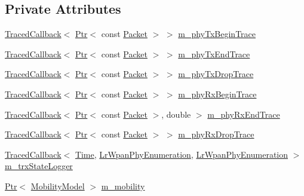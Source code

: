 \subsection*{Private Attributes}
\begin{DoxyCompactItemize}
\item 
\hyperlink{classns3_1_1TracedCallback}{Traced\+Callback}$<$ \hyperlink{classns3_1_1Ptr}{Ptr}$<$ const \hyperlink{classns3_1_1Packet}{Packet} $>$ $>$ \hyperlink{classns3_1_1LrWpanPhy_a72273155da1a3b5340389633f5486860}{m\+\_\+phy\+Tx\+Begin\+Trace}
\item 
\hyperlink{classns3_1_1TracedCallback}{Traced\+Callback}$<$ \hyperlink{classns3_1_1Ptr}{Ptr}$<$ const \hyperlink{classns3_1_1Packet}{Packet} $>$ $>$ \hyperlink{classns3_1_1LrWpanPhy_a34c1c896916f90010cd7f4ba5eaa5385}{m\+\_\+phy\+Tx\+End\+Trace}
\item 
\hyperlink{classns3_1_1TracedCallback}{Traced\+Callback}$<$ \hyperlink{classns3_1_1Ptr}{Ptr}$<$ const \hyperlink{classns3_1_1Packet}{Packet} $>$ $>$ \hyperlink{classns3_1_1LrWpanPhy_ac8651acbf8f744b8442c05a490a35720}{m\+\_\+phy\+Tx\+Drop\+Trace}
\item 
\hyperlink{classns3_1_1TracedCallback}{Traced\+Callback}$<$ \hyperlink{classns3_1_1Ptr}{Ptr}$<$ const \hyperlink{classns3_1_1Packet}{Packet} $>$ $>$ \hyperlink{classns3_1_1LrWpanPhy_acd238a82f3646333c30a9100fecafbda}{m\+\_\+phy\+Rx\+Begin\+Trace}
\item 
\hyperlink{classns3_1_1TracedCallback}{Traced\+Callback}$<$ \hyperlink{classns3_1_1Ptr}{Ptr}$<$ const \hyperlink{classns3_1_1Packet}{Packet} $>$, double $>$ \hyperlink{classns3_1_1LrWpanPhy_a6d8ee60f128cdce862893fc9e0e5eda3}{m\+\_\+phy\+Rx\+End\+Trace}
\item 
\hyperlink{classns3_1_1TracedCallback}{Traced\+Callback}$<$ \hyperlink{classns3_1_1Ptr}{Ptr}$<$ const \hyperlink{classns3_1_1Packet}{Packet} $>$ $>$ \hyperlink{classns3_1_1LrWpanPhy_aa649b07e1ef1151e1758c5091e6a7a00}{m\+\_\+phy\+Rx\+Drop\+Trace}
\item 
\hyperlink{classns3_1_1TracedCallback}{Traced\+Callback}$<$ \hyperlink{classns3_1_1Time}{Time}, \hyperlink{group__lr-wpan_ga6494269d13d45c511a07b7ccbb1de754}{Lr\+Wpan\+Phy\+Enumeration}, \hyperlink{group__lr-wpan_ga6494269d13d45c511a07b7ccbb1de754}{Lr\+Wpan\+Phy\+Enumeration} $>$ \hyperlink{classns3_1_1LrWpanPhy_ae48d12b3f7dd9ebc93ae1a7e0d570f52}{m\+\_\+trx\+State\+Logger}
\item 
\hyperlink{classns3_1_1Ptr}{Ptr}$<$ \hyperlink{classns3_1_1MobilityModel}{Mobility\+Model} $>$ \hyperlink{classns3_1_1LrWpanPhy_a746dc7299fae28fafa617075ca3b5433}{m\+\_\+mobility}

\end{DoxyCompactItemize}
